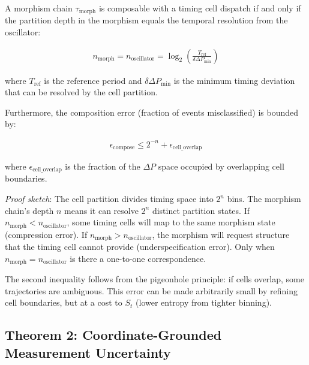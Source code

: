 \documentclass[11pt,twocolumn]{article}
\begin{document}
\begin{theorem}
\label{thm:temporal-partition}
A morphism chain $\tau_{\text{morph}}$ is composable with a timing cell dispatch if and only if the partition depth in the morphism equals the temporal resolution from the oscillator:

\begin{align}
n_{\text{morph}} = n_{\text{oscillator}} = \log_2\left(\frac{T_{\text{ref}}}{\delta \Delta P_{\text{min}}}\right)
\end{align}

\noindent where $T_{\text{ref}}$ is the reference period and $\delta \Delta P_{\text{min}}$ is the minimum timing deviation that can be resolved by the cell partition.

Furthermore, the composition error (fraction of events misclassified) is bounded by:

\begin{align}
\epsilon_{\text{compose}} \leq 2^{-n} + \epsilon_{\text{cell\_overlap}}
\end{align}

\noindent where $\epsilon_{\text{cell\_overlap}}$ is the fraction of the $\Delta P$ space occupied by overlapping cell boundaries.
\end{theorem}

\textit{Proof sketch}: The cell partition divides timing space into $2^n$ bins. The morphism chain's depth $n$ means it can resolve $2^n$ distinct partition states. If $n_{\text{morph}} < n_{\text{oscillator}}$, some timing cells will map to the same morphism state (compression error). If $n_{\text{morph}} > n_{\text{oscillator}}$, the morphism will request structure that the timing cell cannot provide (underspecification error). Only when $n_{\text{morph}} = n_{\text{oscillator}}$ is there a one-to-one correspondence.

The second inequality follows from the pigeonhole principle: if cells overlap, some trajectories are ambiguous. This error can be made arbitrarily small by refining cell boundaries, but at a cost to $S_t$ (lower entropy from tighter binning).

\subsection{Theorem 2: Coordinate-Grounded Measurement Uncertainty}
\end{document}
